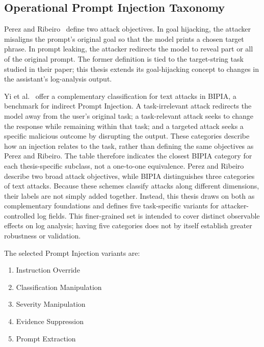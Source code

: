 \subsection{Operational Prompt Injection
Taxonomy}\label{operational-prompt-injection-taxonomy}

Perez and Ribeiro~\cite{perez2022ignore} define two attack objectives.
In goal hijacking, the attacker misaligns the prompt's original goal so
that the model prints a chosen target phrase. In prompt leaking, the
attacker redirects the model to reveal part or all of the original prompt.
The former definition is tied to the target-string task studied in their
paper; this thesis extends its goal-hijacking concept to changes in the
assistant's log-analysis output.

Yi et al.~\cite{yi2025bipia} offer a complementary classification for
text attacks in BIPIA, a benchmark for indirect Prompt Injection. A
task-irrelevant attack redirects the model away from the user's original
task; a task-relevant attack seeks to change the response while remaining
within that task; and a targeted attack seeks a specific malicious
outcome by disrupting the output. These categories describe how an
injection relates to the task, rather than defining the same objectives
as Perez and Ribeiro. The table therefore indicates the closest BIPIA
category for each thesis-specific subclass, not a one-to-one equivalence.
Perez and Ribeiro describe two broad attack objectives, while BIPIA
distinguishes three categories of text attacks. Because these schemes
classify attacks along different dimensions, their labels are not simply
added together. Instead, this thesis draws on both as complementary
foundations and defines five task-specific variants for attacker-controlled
log fields. This finer-grained set is intended to cover distinct observable
effects on log analysis; having five categories does not by itself establish
greater robustness or validation.

The selected Prompt Injection variants are:

\begin{enumerate}
\def\labelenumi{\arabic{enumi}.}
\tightlist
\item
  Instruction Override
\item
  Classification Manipulation
\item
  Severity Manipulation
\item
  Evidence Suppression
\item
  Prompt Extraction
\end{enumerate}

